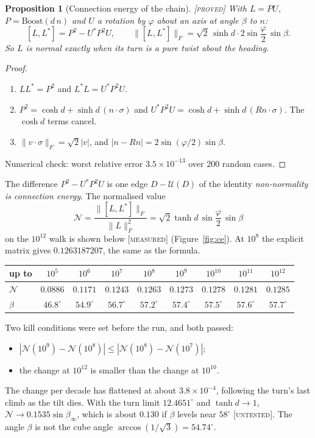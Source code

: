 \documentclass[11pt]{article}
\newtheorem{proposition}{Proposition}
\theoremstyle{definition}
\theoremstyle{remark}
\newcommand{\grade}[1]{\textsc{[#1]}}
\begin{document}
\begin{proposition}[Connection energy of the chain] \grade{proved}
With $L=PU$, $P=\mathrm{Boost}(d\,n)$ and $U$ a rotation by $\varphi$ about an axis at angle $\beta$ to $n$:
\[
[L,L^*]=P^2-U^*P^2U,\qquad
\|[L,L^*]\|_F=\sqrt2\,\sinh d\cdot 2\sin\frac\varphi2\,\sin\beta .
\]
So $L$ is normal exactly when its turn is a pure twist about the heading.
\end{proposition}
\begin{proof}
\begin{enumerate}
\item $LL^*=P^2$ and $L^*L=U^*P^2U$.
\item $P^2=\cosh d+\sinh d\,(n\cdot\sigma)$ and $U^*P^2U=\cosh d+\sinh d\,(Rn\cdot\sigma)$. The $\cosh d$ terms cancel.
\item $\|v\cdot\sigma\|_F=\sqrt2|v|$, and $|n-Rn|=2\sin(\varphi/2)\sin\beta$.
\end{enumerate}
Numerical check: worst relative error $3.5\times10^{-13}$ over $200$ random cases.
\end{proof}

\noindent The difference $P^2-U^*P^2U$ is one edge $D-\mathcal U(D)$ of the identity \emph{non-normality is connection energy}. The normalised value
\[
\mathcal N=\frac{\|[L,L^*]\|_F}{\|L\|_F^2}=\sqrt2\tanh d\,\sin\frac\varphi2\,\sin\beta
\]
on the $10^{12}$ walk is shown below \grade{measured} (Figure~\ref{fig:ce}). At $10^8$ the explicit matrix gives $0.1263187207$, the same as the formula.

\begin{center}
\begin{tabular}{lcccccccc}
\toprule
up to & $10^5$ & $10^6$ & $10^7$ & $10^8$ & $10^9$ & $10^{10}$ & $10^{11}$ & $10^{12}$\\
\midrule
$\mathcal N$ & $0.0886$ & $0.1171$ & $0.1243$ & $0.1263$ & $0.1273$ & $0.1278$ & $0.1281$ & $0.1285$\\
$\beta$ & $46.8^\circ$ & $54.9^\circ$ & $56.7^\circ$ & $57.2^\circ$ & $57.4^\circ$ & $57.5^\circ$ & $57.6^\circ$ & $57.7^\circ$\\
\bottomrule
\end{tabular}
\end{center}

\noindent Two kill conditions were set before the run, and both passed:
\begin{itemize}
\item $|\mathcal N(10^9)-\mathcal N(10^8)|\le|\mathcal N(10^8)-\mathcal N(10^7)|$;
\item the change at $10^{12}$ is smaller than the change at $10^{10}$.
\end{itemize}
The change per decade has flattened at about $3.8\times10^{-4}$, following the turn's last climb as the tilt dies. With the turn limit $12.4651^\circ$ and $\tanh d\to1$, $\mathcal N\to0.1535\sin\beta_\infty$, which is about $0.130$ if $\beta$ levels near $58^\circ$ \grade{untested}. The angle $\beta$ is not the cube angle $\arccos(1/\sqrt3)=54.74^\circ$.
\end{document}
